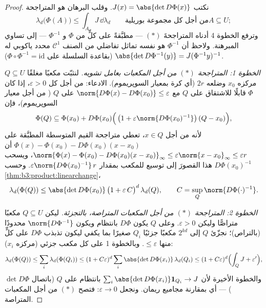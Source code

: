 \begin{proof}
نكتب $J(x) = \abs{\det D\Phi(x)}$. وقلب البرهان هو المتراجحة
\[
\lambda_d\bigl(\Phi(A)\bigr) \leq \int_A J\,\dd\lambda_d
\qquad\text{من أجل كل مجموعة بوريلية} A \subseteq U;
\tag{$*$}
\]
وترفع الخطوة 4 أدناه المتراجحةَ $(*)$ --- مطبَّقةً على كلٍّ من
$\Phi$ و $\Phi^{-1}$ --- إلى تساوي المبرهنة. ولاحظ أن
$\Phi^{-1}$ هو نفسه تماثل تفاضلي من الصنف $\mathcal C^1$ محدد
ياكوبي له $\abs{\det D\Phi^{-1}(y)} = J(\Phi^{-1}y)^{-1}$ (بقاعدة السلسلة على $\Phi\circ\Phi^{-1} = \mathrm{id}$).

\emph{الخطوة 1: المتراجحة $(*)$ من أجل المكعبات بعامل تشويه.}
لنثبّت مكعبًا مغلقًا $Q \subseteq U$ مركزه $x_0$ وضلعه $2r$ (أي
كرة بمعيار السوپريموم). الادعاء: من أجل كل $\varepsilon > 0$، إذا كان
$\Phi$ قابلًا للاشتقاق على $Q$ مع $\norm{D\Phi(x) - D\Phi(x_0)} \leq \varepsilon$ على $Q$ (
من أجل معيار السوپريموم)، فإن
\[
\Phi(Q) \subseteq \Phi(x_0) + D\Phi(x_0)\Bigl(\,\bigl(1 +
\varepsilon\norm{D\Phi(x_0)^{-1}}\bigr)\,(Q - x_0)\Bigr),
\]
لأنه من أجل $x \in Q$، تعطي متراجحة القيم المتوسطة المطبَّقة على
$\Phi(x) - \Phi(x_0) - D\Phi(x_0)(x - x_0)$ أن $\norm{\Phi(x) - \Phi(x_0) - D\Phi(x_0)(x-x_0)}_\infty \leq
\varepsilon\norm{x - x_0}_\infty \leq \varepsilon r$، ويسحب $D\Phi(x_0)^{-1}$ هذا القصورَ إلى توسيع للمكعب
بمقدار $\varepsilon\norm{D\Phi(x_0)^{-1}}\,r$. وحسب \cref{thm:b3:product:linearchange}،
\[
\lambda_d(\Phi(Q)) \leq \abs{\det D\Phi(x_0)}\,
\bigl(1 + \varepsilon\,C\bigr)^{d}\,\lambda_d(Q),
\qquad C = \sup_{Q}\norm{D\Phi(\cdot)^{-1}} .
\]

\emph{الخطوة 2: المتراجحة $(*)$ من أجل المكعبات المتراصة،
بالتجزئة.} ليكن $Q
\subseteq U$ مكعبًا متراصًّا وليكن $\varepsilon > 0$. وعلى $Q$
يكون $D\Phi$  بانتظام ويكون $\norm{D\Phi^{-1}}$ محدودًا (بالتراص)؛
نجزّئ $Q$ إلى $2^{kd}$ مكعبًا جزئيًا $Q_i$ صغيرًا بما يكفي ليكون
تذبذب $D\Phi$ على كلٍّ منها $\leq \varepsilon$. وبالخطوة 1 على كل مكعب
جزئي (مركزه $x_i$):
\[
\lambda_d(\Phi(Q)) \leq \sum_i\lambda_d(\Phi(Q_i))
\leq (1 + C\varepsilon)^d \sum_i \abs{\det
D\Phi(x_i)}\,\lambda_d(Q_i)
\leq (1 + C\varepsilon)^d\Bigl(\int_Q J + \varepsilon'\Bigr),
\]
والخطوة الأخيرة لأن $\sum_i\abs{\det D\Phi(x_i)}\mathbf
1_{Q_i} \to J$ بانتظام على $Q$ (باتصال
$\det D\Phi$) --- أي بمقارنة مجاميع ريمان. ونجعل $\varepsilon \to 0$: فتصح
$(*)$ من أجل المكعبات المتراصة.


\end{proof}
